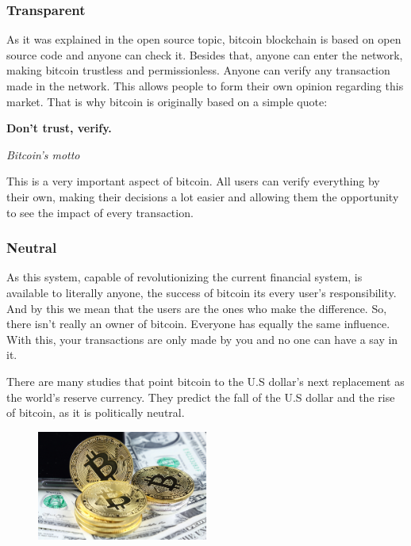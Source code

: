 \documentclass{article}
\newcommand\tab[1][1cm]{\hspace*{#1}}
\begin{document}
\subsubsection{Transparent}

\tab As it was explained in the open source topic, bitcoin blockchain is based on open source code and anyone can check it. Besides that, anyone can enter the network, making bitcoin trustless and permissionless. Anyone can verify any transaction made in the network. This allows people to form their own opinion regarding this market. That is why bitcoin is originally based on a simple quote:

\renewcommand{\epigraphflush}{center}
\epigraph{\textbf{Don't trust, verify.}}{\textit{Bitcoin's motto}}

This is a very important aspect of bitcoin. All users can verify everything by their own, making their decisions a lot easier and allowing them the opportunity to see the impact of every transaction.


\subsubsection{Neutral}

\tab As this system, capable of revolutionizing the current financial system, is available to literally anyone, the success of bitcoin its every user's responsibility. And by this we mean that the users are the ones who make the difference. So, there isn't really an owner of bitcoin. Everyone has equally the same influence. With this, your transactions are only made by you and no one can have a say in it. 

There are many studies that point bitcoin to the U.S dollar's next replacement as the world's reserve currency. They predict the fall of the U.S dollar and the rise of bitcoin, as it is politically neutral. 

\begin{figure}[H]
    \begin{center}
        \includegraphics[width=0.5\textwidth]{images/dollar_bitcoin.jpeg}
    \end{center}
\end{figure}
\end{document}
